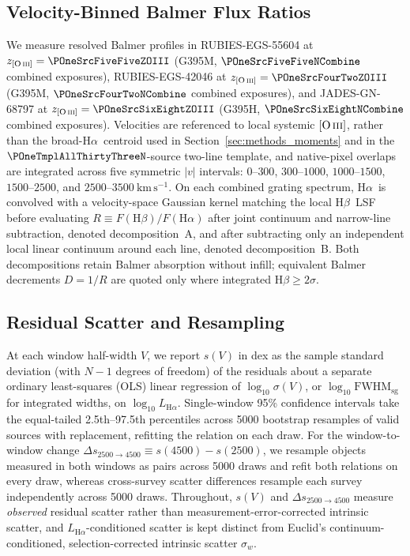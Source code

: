 \documentclass[twocolumn]{aastex631}
\newcommand{\Ha}{\ensuremath{\mathrm{H}\alpha}}
\newcommand{\Hb}{\ensuremath{\mathrm{H}\beta}}
\newcommand{\OIII}{\ensuremath{[\mathrm{O\,\textsc{iii}}]}}
\newcommand{\kms}{\ensuremath{\mathrm{km\,s^{-1}}}}
\newcommand{\LHa}{\ensuremath{L_{\mathrm{H}\alpha}}}
\newcommand{\FWHMsg}{\ensuremath{\mathrm{FWHM}_{\mathrm{sg}}}}
\newcommand{\sigV}{\ensuremath{\sigma(V)}}
\begin{document}
\subsection{Velocity-Binned Balmer Flux Ratios}
\label{sec:methods_balmer}

We measure resolved Balmer profiles in RUBIES-EGS-55604 at $z_{\OIII} = \POneSrcFiveFiveZOIII$ (G395M, $\POneSrcFiveFiveNCombine$ combined exposures), RUBIES-EGS-42046 at $z_{\OIII} = \POneSrcFourTwoZOIII$ (G395M, $\POneSrcFourTwoNCombine$ combined exposures), and JADES-GN-68797 at $z_{\OIII} = \POneSrcSixEightZOIII$ (G395H, $\POneSrcSixEightNCombine$ combined exposures). Velocities are referenced to local systemic \OIII, rather than the broad-\Ha\ centroid used in Section~\ref{sec:methods_moments} and in the $\POneTmplAllThirtyThreeN$-source two-line template, and native-pixel overlaps are integrated across five symmetric $|v|$ intervals: $0$--$300$, $300$--$1000$, $1000$--$1500$, $1500$--$2500$, and $2500$--$3500~\kms$. On each combined grating spectrum, \Ha\ is convolved with a velocity-space Gaussian kernel matching the local \Hb\ LSF before evaluating $R \equiv F(\Hb)/F(\Ha)$ after joint continuum and narrow-line subtraction, denoted decomposition~A, and after subtracting only an independent local linear continuum around each line, denoted decomposition~B. Both decompositions retain Balmer absorption without infill; equivalent Balmer decrements $D = 1/R$ are quoted only where integrated $\Hb \ge 2\sigma$.

\subsection{Residual Scatter and Resampling}
\label{sec:methods_regression}

At each window half-width $V$, we report $s(V)$ in dex as the sample standard deviation (with $N - 1$ degrees of freedom) of the residuals about a separate ordinary least-squares (OLS) linear regression of $\log_{10}\sigV$, or $\log_{10}\FWHMsg$ for integrated widths, on $\log_{10}\LHa$. Single-window 95\% confidence intervals take the equal-tailed 2.5th--97.5th percentiles across 5000 bootstrap resamples of valid sources with replacement, refitting the relation on each draw. For the window-to-window change $\Delta s_{2500\to 4500} \equiv s(4500) - s(2500)$, we resample objects measured in both windows as pairs across 5000 draws and refit both relations on every draw, whereas cross-survey scatter differences resample each survey independently across 5000 draws. Throughout, $s(V)$ and $\Delta s_{2500\to 4500}$ measure \emph{observed} residual scatter rather than measurement-error-corrected intrinsic scatter, and \LHa-conditioned scatter is kept distinct from Euclid's continuum-conditioned, selection-corrected intrinsic scatter $\sigma_w$.
\end{document}
